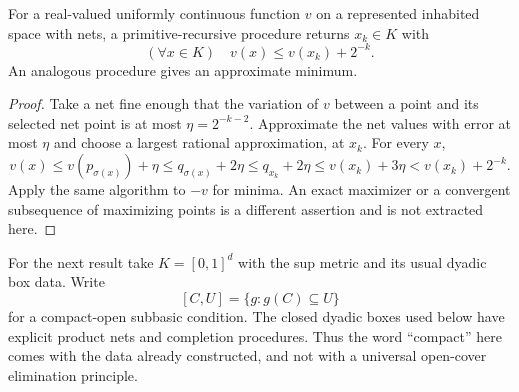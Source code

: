 \begin{corollary}
\label{cor:approximate-extrema}
For a real-valued uniformly continuous function $v$ on a represented
inhabited space with nets, a primitive-recursive procedure returns
$x_k\in K$ with
\[
 (\forall x\in K)\quad v(x)\leq v(x_k)+2^{-k}.
\]
An analogous procedure gives an approximate minimum.
\end{corollary}
\begin{proof}
Take a net fine enough that the variation of $v$ between a point and its
selected net point is at most $\eta=2^{-k-2}$.  Approximate the net
values with error at most $\eta$ and choose a largest rational
approximation, at $x_k$.  For every $x$,
\[
 v(x)\leq v(p_{\sigma(x)})+\eta
 \leq q_{\sigma(x)}+2\eta
 \leq q_{x_k}+2\eta
 \leq v(x_k)+3\eta<v(x_k)+2^{-k}.
\]
Apply the same algorithm to $-v$ for minima.  An exact maximizer or a
convergent subsequence of maximizing points is a different assertion and
is not extracted here.
\end{proof}

For the next result take $K=[0,1]^d$ with the sup metric and its usual
dyadic box data.  Write
\[
 [C,U]=\{g:g(C)\subseteq U\}
\]
for a compact-open subbasic condition.  The closed dyadic boxes used
below have explicit product nets and completion procedures.  Thus the
word ``compact'' here comes with the data already constructed, and not
with a universal open-cover elimination principle.

